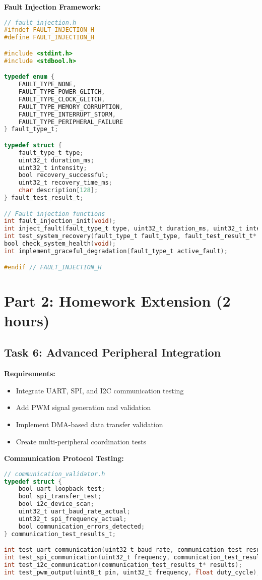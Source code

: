 \documentclass[11pt,a4paper]{article}
\begin{document}
\textbf{Fault Injection Framework:}
\begin{lstlisting}[language=C]
// fault_injection.h
#ifndef FAULT_INJECTION_H
#define FAULT_INJECTION_H

#include <stdint.h>
#include <stdbool.h>

typedef enum {
    FAULT_TYPE_NONE,
    FAULT_TYPE_POWER_GLITCH,
    FAULT_TYPE_CLOCK_GLITCH,
    FAULT_TYPE_MEMORY_CORRUPTION,
    FAULT_TYPE_INTERRUPT_STORM,
    FAULT_TYPE_PERIPHERAL_FAILURE
} fault_type_t;

typedef struct {
    fault_type_t type;
    uint32_t duration_ms;
    uint32_t intensity;
    bool recovery_successful;
    uint32_t recovery_time_ms;
    char description[128];
} fault_test_result_t;

// Fault injection functions
int fault_injection_init(void);
int inject_fault(fault_type_t type, uint32_t duration_ms, uint32_t intensity);
int test_system_recovery(fault_type_t fault_type, fault_test_result_t* result);
bool check_system_health(void);
int implement_graceful_degradation(fault_type_t active_fault);

#endif // FAULT_INJECTION_H
\end{lstlisting}

\section{Part 2: Homework Extension (2 hours)}

\subsection{Task 6: Advanced Peripheral Integration}

\textbf{Requirements:}
\begin{itemize}
    \item Integrate UART, SPI, and I2C communication testing
    \item Add PWM signal generation and validation
    \item Implement DMA-based data transfer validation
    \item Create multi-peripheral coordination tests
\end{itemize}

\textbf{Communication Protocol Testing:}
\begin{lstlisting}[language=C]
// communication_validator.h
typedef struct {
    bool uart_loopback_test;
    bool spi_transfer_test;
    bool i2c_device_scan;
    uint32_t uart_baud_rate_actual;
    uint32_t spi_frequency_actual;
    bool communication_errors_detected;
} communication_test_results_t;

int test_uart_communication(uint32_t baud_rate, communication_test_results_t* results);
int test_spi_communication(uint32_t frequency, communication_test_results_t* results);
int test_i2c_communication(communication_test_results_t* results);
int test_pwm_output(uint8_t pin, uint32_t frequency, float duty_cycle);
\end{lstlisting}
\end{document}
